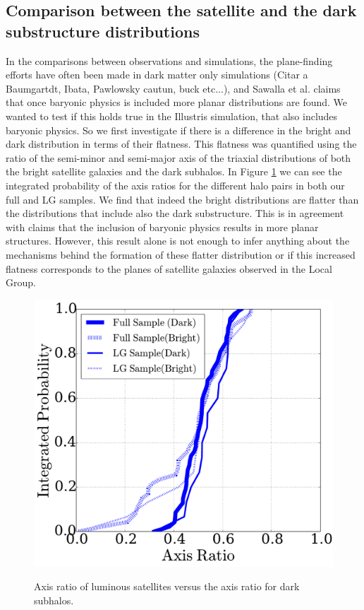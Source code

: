 \subsection{Comparison between the satellite and the dark substructure distributions}
\label{DarkBright}
In the comparisons between observations and simulations, the plane-finding efforts have often been made in dark matter only simulations (Citar a Baumgartdt, Ibata, Pawlowsky cautun, buck etc...), and Sawalla et al. claims that once baryonic physics is included more planar distributions are found.
We wanted to test if this holds true in the Illustris simulation, that
also includes baryonic physics. So we first investigate if there is a
difference in the bright and dark distribution in terms of their
flatness.  
This flatness was quantified using the ratio of the semi-minor and
semi-major axis of the triaxial distributions of both the bright
satellite galaxies and the dark subhalos.  
In Figure \ref{fig:StreamPlaneOrbit} we can see the integrated
probability of the axis ratios for the different halo pairs in both
our full and LG samples.  
We find that indeed the bright distributions are flatter than the
distributions that include also the dark substructure. 
This is in agreement with claims that the inclusion of baryonic
physics results in more planar structures.  
However, this result alone is not enough to infer anything about the
mechanisms behind the formation of these flatter distribution or if
this increased flatness corresponds to the planes of satellite
galaxies observed in the Local Group.\\ 
\begin{figure}
\includegraphics[width=\hsize]{axratio_dark_bright.pdf}\\
\caption{Axis ratio of luminous satellites versus the axis ratio for
  dark subhalos.}
\label{fig:StreamPlaneOrbit}
\end{figure}

